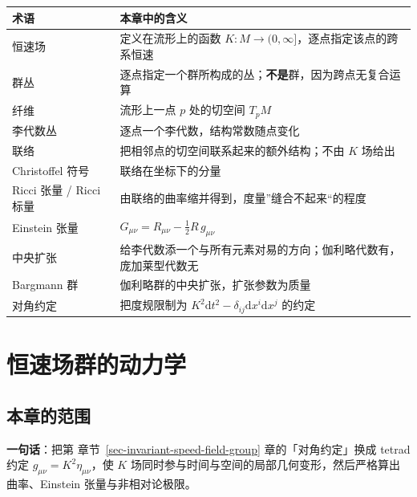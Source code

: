 \documentclass[
  chinese,
  a4paper,
  UTF8,
  12pt,
  oneside,
  openany]{ctexbook}
\newcounter{none} %
\theoremstyle{plain}
\theoremstyle{plain}
\theoremstyle{plain}
\theoremstyle{definition}
\theoremstyle{plain}
\theoremstyle{plain}
\theoremstyle{remark}
\begin{document}
{\def\LTcaptype{none} %
\begin{longtable}[]{@{}
  >{\raggedright\arraybackslash}p{}
  >{\raggedright\arraybackslash}p{}@{}}
\toprule\noalign{}
\begin{minipage}[b]{\linewidth}\raggedright
术语
\end{minipage} & \begin{minipage}[b]{\linewidth}\raggedright
本章中的含义
\end{minipage} \\
\midrule\noalign{}
\endhead
\bottomrule\noalign{}
\endlastfoot
恒速场 & 定义在流形上的函数
\(K:M\to(0,\infty]\)，逐点指定该点的跨系恒速 \\
群丛 & 逐点指定一个群所构成的丛；\textbf{不是}群，因为跨点无复合运算 \\
纤维 & 流形上一点 \(p\) 处的切空间 \(T_pM\) \\
李代数丛 & 逐点一个李代数，结构常数随点变化 \\
联络 & 把相邻点的切空间联系起来的额外结构；不由 \(K\) 场给出 \\
Christoffel 符号 & 联络在坐标下的分量 \\
Ricci 张量 / Ricci 标量 &
由联络的曲率缩并得到，度量''缝合不起来``的程度 \\
Einstein 张量 & \(G_{\mu\nu}=R_{\mu\nu}-\frac{1}{2}R\,g_{\mu\nu}\) \\
中央扩张 &
给李代数添一个与所有元素对易的方向；伽利略代数有，庞加莱型代数无 \\
Bargmann 群 & 伽利略群的中央扩张，扩张参数为质量 \\
对角约定 & 把度规限制为
\(K^{2}\mathrm{d}t^{2}-\delta_{ij}\mathrm{d}x^{i}\mathrm{d}x^{j}\)
的约定 \\
\end{longtable}
}


\chapter{恒速场群的动力学}\label{sec-invariant-speed-dynamics}

\section{本章的范围}\label{sec-isd-scope}

\textbf{一句话}：把第 章节~\ref{sec-invariant-speed-field-group}
章的「对角约定」换成 tetrad 约定 \(g_{\mu\nu}=K^{2}\eta_{\mu\nu}\)，使
\(K\) 场同时参与时间与空间的局部几何变形，然后严格算出曲率、Einstein
张量与非相对论极限。
\end{document}
